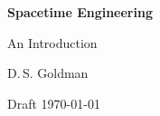 \begin{titlepage}
  \centering
  \vspace*{0.22\textheight}
  {\Huge\bfseries Spacetime Engineering\par}
  \vspace{1.2em}
  {\Large An Introduction\par}
  \vspace{3.5em}
  {\large D.\,S. Goldman\par}
  \vfill
  {\small\color{gray} Draft \enspace\textbullet\enspace \today\par}
\end{titlepage}
